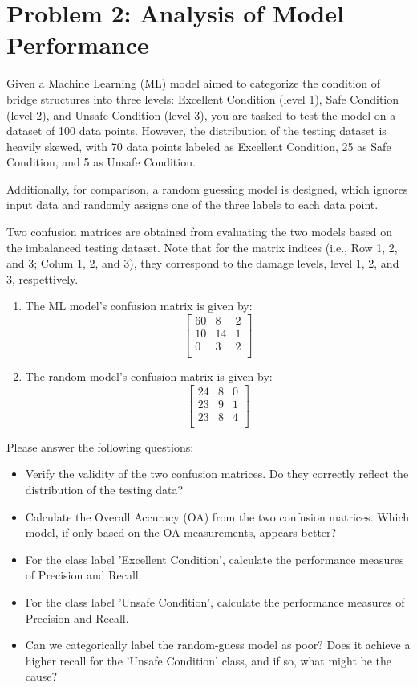 \documentclass[12pt]{article}
\begin{document}
\newpage

\section*{Problem 2: Analysis of Model Performance}

Given a Machine Learning (ML) model aimed to categorize the condition of bridge structures into three levels: Excellent Condition (level 1), Safe Condition (level 2), and Unsafe Condition (level 3), you are tasked to test the model on a dataset of 100 data points. However, the distribution of the testing dataset is heavily skewed, with 70 data points labeled as Excellent Condition, 25 as Safe Condition, and 5 as Unsafe Condition. 

Additionally, for comparison, a random guessing model is designed, which ignores input data and randomly assigns one of the three labels to each data point.

Two confusion matrices are obtained from evaluating the two models based on the imbalanced testing dataset. Note that for the matrix indices (i.e., Row 1, 2, and 3; Colum 1, 2, and 3), they correspond to the damage levels, level 1, 2, and 3, respettively. 

\begin{enumerate}
    \item The ML model's confusion matrix is given by:
    \[
    \begin{bmatrix}
    60 & 8 & 2 \\
    10 & 14 & 1 \\
    0 & 3 & 2 \\
    \end{bmatrix}
    \]
    
    \item The random model's confusion matrix is given by:
    \[
    \begin{bmatrix}
    24 & 8 & 0 \\
    23 & 9 & 1 \\
    23 & 8 & 4 \\
    \end{bmatrix}
    \]
\end{enumerate}

Please answer the following questions:

\begin{itemize}
    \item [(1)] Verify the validity of the two confusion matrices. Do they correctly reflect the distribution of the testing data?
    \item [(2)] Calculate the Overall Accuracy (OA) from the two confusion matrices. Which model, if only based on the OA measurements, appears better?
    \item [(3)] For the class label 'Excellent Condition', calculate the performance measures of Precision and Recall.
    \item [(4)] For the class label 'Unsafe Condition', calculate the performance measures of Precision and Recall.
    \item [(5)] Can we categorically label the random-guess model as poor? Does it achieve a higher recall for the 'Unsafe Condition' class, and if so, what might be the cause?
\end{itemize}
\end{document}
